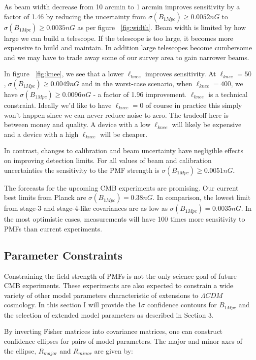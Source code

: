 As beam width decrease from 10 arcmin to 1 arcmin improves sensitivity by a factor of 1.46 by reducing the uncertainty from $\sigma(B_{1Mpc}) \geq 0.0052nG$ to $\sigma(B_{1Mpc}) \geq 0.0035nG$ as per figure ~\ref{fig:width}. Beam width is limited by how large we can build a telescope. If the telescope is too large, it becomes more expensive to build and maintain. In addition large telescopes become cumbersome and we may have to trade away some of our survey area to gain narrower beams.

In figure ~\ref{fig:knee}, we see that a lower $\ell_{knee}$ improves sensitivity. At $\ell_{knee} = 50$, $\sigma(B_{1Mpc}) \geq 0.0049nG$ and in the worst-case scenario, when $\ell_{knee} = 400$, we have $\sigma(B_{1Mpc}) \geq 0.0096nG$ - a factor of 1.96 improvement. $\ell_{knee}$ is a technical constraint. Ideally we'd like to have $\ell_{knee} = 0$ of course in practice this simply won't happen since we can never reduce noise to zero. The tradeoff here is between money and quality. A device with a low $\ell_{knee}$ will likely be expensive and a device with a high $\ell_{knee}$ will be cheaper. 

In contrast, changes to calibration and beam uncertainty have negligible effects on improving detection limits. For all values of beam and calibration uncertainties the sensitivity to the PMF strength is $\sigma(B_{1Mpc}) \geq 0.0051nG$.

The forecasts for the upcoming CMB experiments are promising. Our current best limits from Planck are $\sigma(B_{1Mpc}) = 0.38nG$. In comparison, the lowest limit from stage-3 and stage-4-like covariances are as low as $\sigma(B_{1Mpc}) = 0.0035nG$. In the most optimistic cases, measurements will have 100 times more sensitivity to PMFs than current experiments.

\subsection{Parameter Constraints}

Constraining the field strength of PMFs is not the only science goal of future CMB experiments. These experiments are also expected to constrain a wide variety of other model parameters characteristic of extensions to $\Lambda CDM$ cosmology. In this section I will provide the 1$\sigma$ confidence contours for $B_{1Mpc}$ and the selection of extended model parameters as described in Section 3.

By inverting Fisher matrices into covariance matrices, one can construct confidence ellipses for pairs of model parameters. The major and minor axes of the ellipse, $R_{major}$ and $R_{minor}$ are given by:

